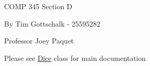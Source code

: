 C\+O\+MP 345 Section D

By Tim Gottschalk -\/ 25595282

Professor Joey Paquet

Please see \hyperlink{class_dice}{Dice} class for main documentation 